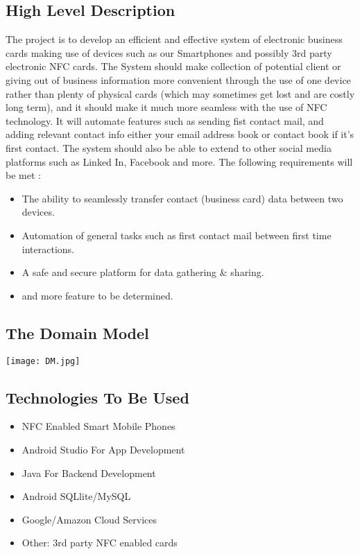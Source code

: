 \documentclass[11pt]{article}
\begin{document}
\subsection{High Level Description}
The project is to develop an efficient and effective system of electronic business cards making use of devices such as our Smartphones and possibly 3rd party electronic NFC cards. The System should make collection of potential client or giving out of business information more convenient through the use of one device rather than plenty of physical cards (which may sometimes get lost and are costly long term), and it should make it much more seamless with the use of NFC technology. It will automate features such as sending fist contact mail, and adding relevant contact info either your email address book or contact book if it's first contact. The system should also be able to extend to other social media platforms such as Linked In, Facebook and more.
\newline
\newline The following requirements will be met : 
\begin{itemize}
\item The ability to seamlessly transfer contact (business card) data  between two devices.
\item Automation of general tasks such as first contact mail between first time interactions.
\item A safe and secure platform for data gathering \& sharing.
\item and more feature to be determined.
\end{itemize}

\subsection{The Domain Model}
\texttt{[image: DM.jpg]}
           

\subsection{Technologies To Be Used}
\begin{itemize}
\item NFC Enabled Smart Mobile Phones
\item Android Studio For App Development
\item Java For Backend Development
\item Android SQLlite/MySQL
\item Google/Amazon Cloud Services
\item Other: 3rd party NFC enabled cards 
\end{itemize}
\end{document}
